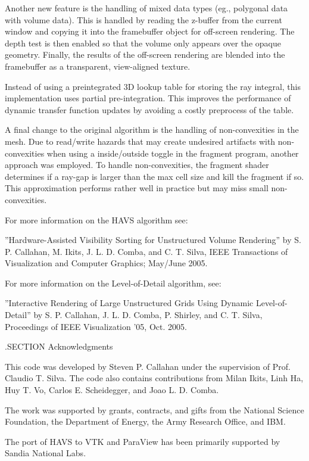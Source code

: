  Another new feature is the handling of mixed data types (eg., polygonal
 data with volume data).  This is handled by reading the z-buffer from the
 current window and copying it into the framebuffer object for off-screen
 rendering.  The depth test is then enabled so that the volume only appears
 over the opaque geometry.  Finally, the results of the off-screen rendering
 are blended into the framebuffer as a transparent, view-aligned texture. 
 
 Instead of using a preintegrated 3D lookup table for storing the ray
 integral, this implementation uses partial pre-integration.  This improves
 the performance of dynamic transfer function updates by avoiding a costly
 preprocess of the table.

 A final change to the original algorithm is the handling of non-convexities
 in the mesh.  Due to read/write hazards that may create undesired artifacts
 with non-convexities when using a inside/outside toggle in the fragment
 program, another approach was employed.  To handle non-convexities, the
 fragment shader determines if a ray-gap is larger than the max cell size
 and kill the fragment if so.  This approximation performs rather well in
 practice but may miss small non-convexities.
 
 For more information on the HAVS algorithm see:

  ''Hardware-Assisted Visibility Sorting for Unstructured Volume
 Rendering'' by S. P. Callahan, M. Ikits, J. L. D. Comba, and C. T. Silva, 
 IEEE Transactions of Visualization and Computer Graphics; May/June 2005.

 For more information on the Level-of-Detail algorithm, see:

 ''Interactive Rendering of Large Unstructured Grids Using Dynamic
 Level-of-Detail'' by S. P. Callahan, J. L. D. Comba, P. Shirley, and
 C. T. Silva, Proceedings of IEEE Visualization '05, Oct. 2005.

 .SECTION Acknowledgments

 This code was developed by Steven P. Callahan under the supervision
 of Prof. Claudio T. Silva. The code also contains contributions
 from Milan Ikits, Linh Ha, Huy T. Vo, Carlos E. Scheidegger, and 
 Joao L. D. Comba.  

 The work was supported by grants, contracts, and gifts from the
 National Science Foundation, the Department of Energy, the Army
 Research Office, and IBM.

 The port of HAVS to VTK and ParaView has been primarily supported
 by Sandia National Labs.


